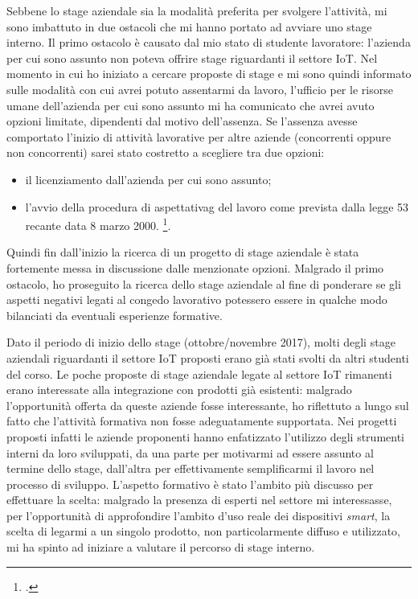 Sebbene lo stage aziendale sia la modalità preferita per svolgere l'attività, mi sono imbattuto in due ostacoli che mi hanno portato ad avviare uno stage interno.
Il primo ostacolo è causato dal mio stato di studente lavoratore: l'azienda per cui sono assunto non poteva offrire stage riguardanti il settore IoT.
Nel momento in cui ho iniziato a cercare proposte di stage e mi sono quindi informato sulle modalità con cui avrei potuto assentarmi da lavoro,
l'ufficio per le risorse umane dell'azienda per cui sono assunto mi ha comunicato che avrei avuto opzioni limitate, dipendenti dal motivo dell'assenza.
Se l'assenza avesse comportato l'inizio di attività lavorative per altre aziende (concorrenti oppure non concorrenti) sarei stato costretto a scegliere tra due opzioni:
\begin{itemize}
  \item il licenziamento dall'azienda per cui sono assunto;
  \item l'avvio della procedura di \gls{aspettativag} del lavoro come prevista dalla legge 53 recante data 8 marzo 2000. \footcite{site:aspettativa}.
\end{itemize}
Quindi fin dall'inizio la ricerca di un progetto di stage aziendale è stata fortemente messa in discussione dalle menzionate opzioni.
Malgrado il primo ostacolo, ho proseguito la ricerca dello stage aziendale al fine di ponderare se gli aspetti negativi legati al congedo lavorativo potessero essere in qualche modo bilanciati da eventuali esperienze formative.

Dato il periodo di inizio dello stage (ottobre/novembre 2017), molti degli stage aziendali riguardanti il settore IoT proposti erano già stati svolti da altri studenti del corso.
Le poche proposte di stage aziendale legate al settore IoT rimanenti erano interessate alla integrazione con prodotti già esistenti:
malgrado l'opportunità offerta da queste aziende fosse interessante, ho riflettuto a lungo sul fatto che l'attività formativa non fosse adeguatamente supportata.
Nei progetti proposti infatti le aziende proponenti hanno enfatizzato l'utilizzo degli strumenti interni da loro sviluppati, da una parte per motivarmi ad essere assunto al termine dello stage,
dall'altra per effettivamente semplificarmi il lavoro nel processo di sviluppo.
L'aspetto formativo è stato l'ambito più discusso per effettuare la scelta: malgrado la presenza di esperti nel settore mi interessasse,
per l'opportunità di approfondire l'ambito d'uso reale dei dispositivi \emph{smart}, la scelta di legarmi a un singolo prodotto, non particolarmente diffuso e utilizzato,
mi ha spinto ad iniziare a valutare il percorso di stage interno.


